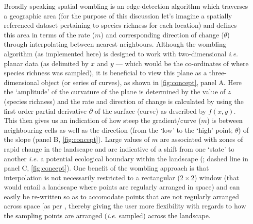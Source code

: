 Broadly speaking spatial wombling is an edge-detection algorithm which
traverses a geographic area (for the purpose of this discussion let's
imagine a spatially referenced dataset pertaining to species richness
for each location) and defines this area in terms of the rate ($m$)
and corresponding direction of change ($\theta$) through interpolating
between nearest neighbours. Although the wombling algorithm (as
implemented here) is designed to work with two-dimensional \emph{i.e.}
planar data (as delimited by $x$ and $y$ --- which would be the
co-ordinates of where species richness was sampled), it is beneficial to
view this plane as a three-dimensional object (or series of curves), as
shown in \autoref{fig:concept}, panel A. Here the `amplitude' of the curvature of
the plane is determined by the value of $z$ (species richness) and the
rate and direction of change is calculated by using the first-order
partial derivative $\partial$ of the surface (curve) as described by
$f(x,y)$. This then gives us an indication of how steep the
gradient/curve ($m$) is between neighbouring cells as well as the
direction (from the `low' to the `high' point; $\theta$) of the slope
(panel B, \autoref{fig:concept}). Large values of $m$ are associated with zones
of rapid change in the landscape and are indicative of a shift from one
`state' to another \emph{i.e.} a potential ecological boundary within
the landscape (\cite{Fortin2005SpaAna}; dashed line in panel C,
\autoref{fig:concept}). One benefit of the wombling approach is that
interpolation is not necessarily restricted to a rectangular
($2 \times 2$) window (that would entail a landscape where points are
regularly arranged in space) and can easily be re-written so as to
accomodate points that are not regularly arranged across space {[}as per
\cite{Fortin1994EdgDet}, thereby giving the user more flexibility with
regards to how the sampling points are arranged (\emph{i.e.} sampled)
across the landscape.

